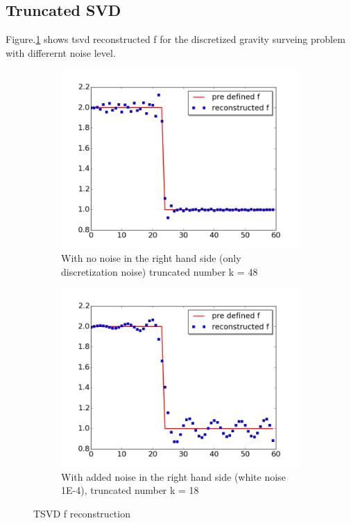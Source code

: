 \documentclass{article}
\begin{document}
\subsection{Truncated SVD}
Figure.\ref{fig:tsvd_plot} shows tsvd reconstructed f for the discretized
gravity surveing problem with differernt noise level.
\begin{figure}
	\centering
		\begin{subfigure}[b]{0.7\textwidth}
			\includegraphics[width=\textwidth]{images/TSVD/tsvdplot}
			\caption{With
			no noise in the right hand side (only discretization noise) truncated number
			k = 48}
		\end{subfigure}
		\begin{subfigure}[b]{0.7\textwidth}
			\includegraphics[width=\textwidth]{images/TSVD/tsvdplot_withnoise}
			\caption{With
			added noise in the right hand side (white noise 1E-4), truncated number k =
			18}
		\end{subfigure}
		\caption{TSVD f reconstruction}\label{fig:tsvd_plot}
\end{figure}
\end{document}
